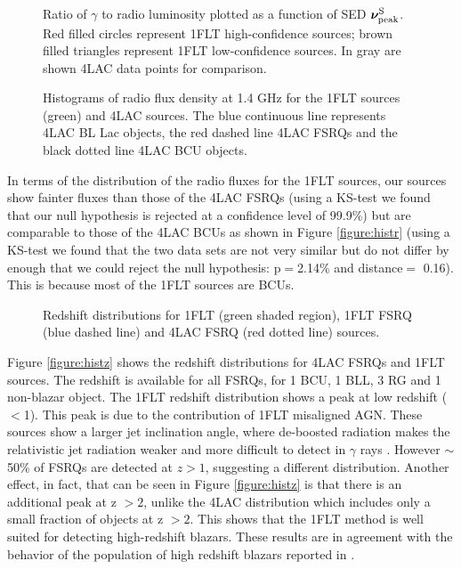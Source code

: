 \documentclass{aastex62}
\begin{document}
\begin{figure}[hbt!]
 \caption{Ratio of $\gamma$ to radio luminosity plotted as a function of SED $\mathbold{\nu_{\rm peak}^{\rm S}}$. Red filled circles represent 1FLT high-confidence sources; brown filled triangles represent 1FLT low-confidence sources. In gray are shown 4LAC data points for comparison.}
\end{figure}\label{figure:ratio}

\begin{figure}[hbt!]
 \caption{Histograms of radio flux density at 1.4 GHz for the 1FLT sources (green) and 4LAC sources. The blue continuous line represents  4LAC BL Lac objects, the red dashed line 4LAC FSRQs  and the black dotted line 4LAC BCU objects.}
\end{figure}\label{figure:histr}


In terms of the distribution of the radio fluxes for the 1FLT sources, our sources show fainter fluxes than those of the 4LAC FSRQs (using a KS-test we found that our  null hypothesis is rejected at a confidence level of 99.9\%)  but are comparable to those of the 4LAC BCUs as shown in Figure \ref{figure:histr} (using a KS-test we found that the two data sets are not very similar but do not differ by enough that we could reject the null hypothesis: p$=$2.14\% and distance$=$ 0.16).
This is because most of the 1FLT sources are BCUs.


\begin{figure}[hbt!]
 \caption{Redshift distributions for 1FLT (green shaded region), 1FLT FSRQ (blue dashed line) and 4LAC FSRQ (red dotted line) sources.}
\end{figure}\label{figure:histz}

Figure \ref{figure:histz} shows the redshift distributions for 4LAC FSRQs and 1FLT sources. The redshift is available for all FSRQs, for 1 BCU, 1 BLL, 3 RG and 1 non-blazar object. The 1FLT redshift distribution shows a peak at low redshift ($<$1). This peak is due to the contribution of 1FLT misaligned AGN. These sources show a larger jet inclination angle, where de-boosted radiation makes the relativistic jet radiation weaker and more difficult to detect in $\gamma$ rays \citep{abdo2010magn}.  
However $\sim$ 50\% of FSRQs are detected at $z >1$, suggesting a different distribution.
Another effect, in fact, that can be seen in Figure \ref{figure:histz} is that there is an additional peak at z $>2$, unlike the 4LAC distribution which includes only a small fraction of objects at z $>2$.
This shows that the 1FLT method is well suited for detecting high-redshift blazars. 
These results are in agreement with the behavior of the population of high redshift blazars reported in \citet{kreter2020search}.
\end{document}
